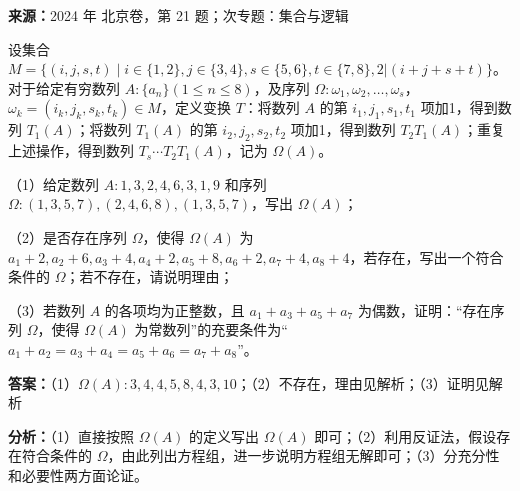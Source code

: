 \begin{question}[points=14]
\textbf{来源：}2024 年 北京卷，第 21 题；次专题：集合与逻辑\par
设集合 $M = \{(i,j,s,t) \mid i\in\{1,2\}, j\in\{3,4\}, s\in\{5,6\}, t\in\{7,8\}, 2|(i+j+s+t)\}$。对于给定有穷数列 $A:\{a_n\}(1\leq n\leq 8)$，及序列 $\Omega:\omega_1,\omega_2,\dots,\omega_s$，$\omega_k=(i_k,j_k,s_k,t_k)\in M$，定义变换 $T$：将数列 $A$ 的第 $i_1,j_1,s_1,t_1$ 项加1，得到数列 $T_1(A)$；将数列 $T_1(A)$ 的第 $i_2,j_2,s_2,t_2$ 项加1，得到数列 $T_2T_1(A)$；重复上述操作，得到数列 $T_s\cdots T_2T_1(A)$，记为 $\Omega(A)$。

（1）给定数列 $A:1,3,2,4,6,3,1,9$ 和序列 $\Omega:(1,3,5,7),(2,4,6,8),(1,3,5,7)$，写出 $\Omega(A)$；

（2）是否存在序列 $\Omega$，使得 $\Omega(A)$ 为 $a_1+2, a_2+6, a_3+4, a_4+2, a_5+8, a_6+2, a_7+4, a_8+4$，若存在，写出一个符合条件的 $\Omega$；若不存在，请说明理由；

（3）若数列 $A$ 的各项均为正整数，且 $a_1+a_3+a_5+a_7$ 为偶数，证明：“存在序列 $\Omega$，使得 $\Omega(A)$ 为常数列”的充要条件为“$a_1+a_2=a_3+a_4=a_5+a_6=a_7+a_8$”。
\begin{solution}
\textbf{答案：}（1）$\Omega(A):3,4,4,5,8,4,3,10$；（2）不存在，理由见解析；（3）证明见解析

\textbf{分析：}（1）直接按照 $\Omega(A)$ 的定义写出 $\Omega(A)$ 即可；（2）利用反证法，假设存在符合条件的 $\Omega$，由此列出方程组，进一步说明方程组无解即可；（3）分充分性和必要性两方面论证。


\end{solution}
\end{question}
